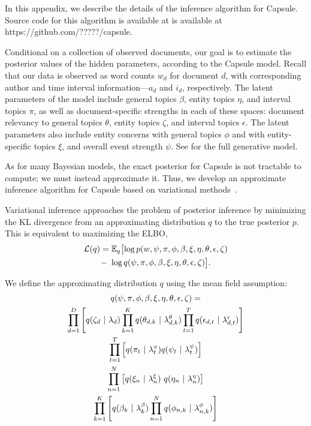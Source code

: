 
In this appendix, we describe the details of the inference algorithm for Capsule. Source code for this algorithm is available at is available at https://github.com/?????/capsule.

Conditional on a collection of observed documents, our goal is to estimate the posterior values of the hidden parameters, according to the Capsule model.   Recall that our data is observed as word counts $w_d$ for document $d$, with corresponding author and time interval information---$a_d$ and $i_d$, respectively.
The latent parameters of the model include general topics $\beta$, entity topics $\eta$, and interval topics $\pi$, as well as document-specific strengths in each of these spaces: document relevancy to general topics $\theta$, entity topics $\zeta$, and interval topics $\epsilon$.  The latent parameters also include entity concerns with general topics $\phi$ and with entity-specific topics $\xi$, and overall event strength $\psi$.  See  for the full generative model.

As for many Bayesian models, the exact posterior for Capsule is not tractable to compute; we must instead approximate it.  Thus, we develop an approximate inference algorithm for Capsule based on variational methods~\cite{jordan1999introduction,Wainwright:2008}.

Variational inference approaches the problem of posterior inference by minimizing the KL divergence from an approximating distribution $q$ to the true posterior $p$.
This is equivalent to maximizing the ELBO,
\begin{multline}
	\mathcal{L}(q)  = \mathbb{E}_{q}\bigl[\log p(w, \psi, \pi, \phi, \beta, \xi, \eta, \theta, \epsilon, \zeta) \\
	-~\log q(\psi, \pi, \phi, \beta, \xi, \eta, \theta, \epsilon, \zeta)\bigr].
	\label{eq:elbo}
\end{multline}

We define the approximating distribution $q$ using the mean field assumption:
\begin{multline}
	q(\psi, \pi, \phi, \beta, \xi, \eta, \theta, \epsilon, \zeta) = \\
	 	\prod_{d=1}^D \left[q(\zeta_d ~\vert~ \lambda_d)
				\prod_{k=1}^K q(\theta_{d,k} ~\vert~ \lambda^\theta_{d,k})
				\prod_{t=1}^T q(\epsilon_{d,t} ~\vert~ \lambda^\epsilon_{d,t})
			\right] \\
		\prod_{t=1}^T \left[ q(\pi_{t} ~\vert~ \lambda^\pi_t) q(\psi_t ~\vert~ \lambda^\psi_t) \right] \\
		\prod_{n=1}^N \left[ q(\xi_{n} ~\vert~ \lambda^\xi_{n})~q(\eta_n ~\vert~ \lambda^{\eta}_{n}) \right] \\
		\prod_{k=1}^K \left[ q(\beta_{k} ~\vert~ \lambda^\beta_k) \prod_{n=1}^N q(\phi_{n,k} ~\vert~ \lambda^\phi_{n,k}) \right]
	\label{eq:q}
\end{multline}

